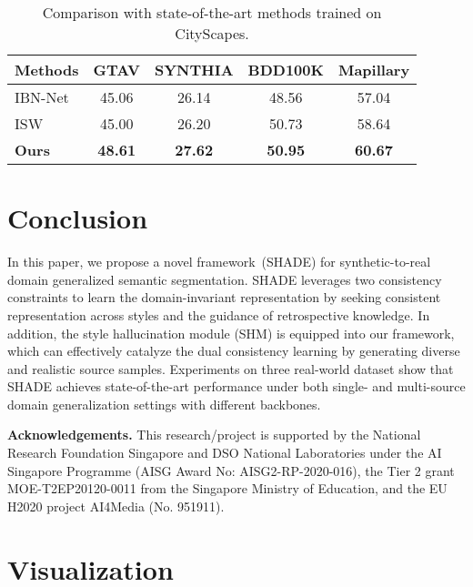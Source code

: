 \documentclass[runningheads]{llncs}
\newcommand{\ours}{SHADE\xspace}
\begin{document}
\begin{table}[t]
\caption{Comparison with state-of-the-art methods trained on CityScapes.}
\footnotesize
    \centering
    \begin{tabular}{l|cccc}
    \toprule
      Methods & GTAV & SYNTHIA & BDD100K & Mapillary \\
    \midrule
    IBN-Net~\cite{ibn} & 45.06 & 26.14 & 48.56 & 57.04 \\
    ISW~\cite{robustnet}  & 45.00 & 26.20 & 50.73 & 58.64 \\
    \textbf{Ours}  & \textbf{48.61} & \textbf{27.62} & \textbf{50.95} & \textbf{60.67} \\
    \bottomrule
    \end{tabular}
    \label{tab:city}
\end{table}

\section{Conclusion}
In this paper, we propose a novel framework~(\ours) for synthetic-to-real domain generalized semantic segmentation. \ours leverages two consistency constraints to learn the domain-invariant representation by seeking consistent representation across styles and the guidance of retrospective knowledge. In addition, the style hallucination module (SHM)  is equipped into our framework, which can effectively catalyze the dual consistency learning by generating diverse and realistic source samples. Experiments on three real-world dataset show that \ours achieves state-of-the-art performance under both single- and multi-source domain generalization settings with different backbones.

\noindent\textbf{Acknowledgements.}
This research/project is supported by the National Research Foundation Singapore and DSO National Laboratories under the AI Singapore Programme (AISG Award No: AISG2-RP-2020-016), the Tier 2 grant MOE-T2EP20120-0011 from the Singapore Ministry of Education, and the EU H2020 project AI4Media (No. 951911). 

\clearpage
\clearpage




\clearpage

\appendix

\section{Visualization}
\label{sec:visualization}
\end{document}
